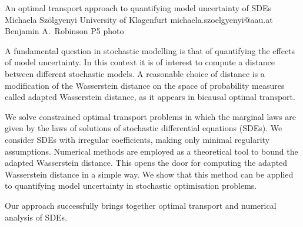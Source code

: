\begin{talk}
  {An optimal transport approach to quantifying model uncertainty of SDEs}%
  {Michaela Sz\"olgyenyi}%
  {University of Klagenfurt}%
  {michaela.szoelgyenyi@aau.at}%
  {Benjamin A.~Robinson}%
  {}%
  {}%
  {P5}%
  {photo}%
			
A fundamental question in stochastic modelling is that of quantifying the effects of model uncertainty. In this context it is of interest to compute a distance between different stochastic models. A  reasonable choice of distance is a modification of the Wasserstein distance on the space of probability measures called adapted Wasserstein distance, as it appears in bicausal optimal transport.

	We solve constrained optimal transport problems in which the marginal laws are given by the laws of solutions of stochastic differential equations (SDEs). We consider SDEs with irregular coefficients, making only minimal regularity assumptions. Numerical methods are employed as a theoretical tool to bound the adapted Wasserstein distance. This opens the door for computing the adapted Wasserstein distance in a simple way. We show that this method can be applied to quantifying model uncertainty in stochastic optimisation problems. 	
	
	Our approach successfully brings together optimal transport and numerical analysis of SDEs. 
\end{talk}

\clearpage


